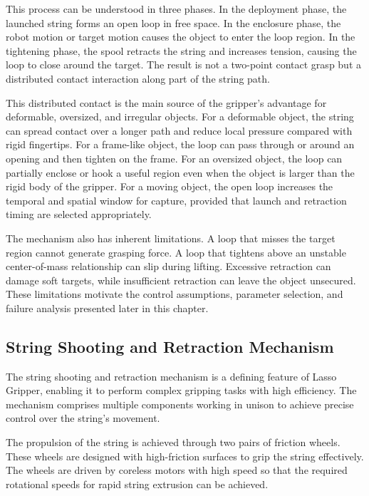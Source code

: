 This process can be understood in three phases. In the deployment phase, the launched string forms an open loop in free space. In the enclosure phase, the robot motion or target motion causes the object to enter the loop region. In the tightening phase, the spool retracts the string and increases tension, causing the loop to close around the target. The result is not a two-point contact grasp but a distributed contact interaction along part of the string path.

This distributed contact is the main source of the gripper's advantage for deformable, oversized, and irregular objects. For a deformable object, the string can spread contact over a longer path and reduce local pressure compared with rigid fingertips. For a frame-like object, the loop can pass through or around an opening and then tighten on the frame. For an oversized object, the loop can partially enclose or hook a useful region even when the object is larger than the rigid body of the gripper. For a moving object, the open loop increases the temporal and spatial window for capture, provided that launch and retraction timing are selected appropriately.

The mechanism also has inherent limitations. A loop that misses the target region cannot generate grasping force. A loop that tightens above an unstable center-of-mass relationship can slip during lifting. Excessive retraction can damage soft targets, while insufficient retraction can leave the object unsecured. These limitations motivate the control assumptions, parameter selection, and failure analysis presented later in this chapter.



\subsection{String Shooting and Retraction Mechanism}

The string shooting and retraction mechanism is a defining feature of Lasso Gripper, enabling it to perform complex gripping tasks with high efficiency. The mechanism comprises multiple components working in unison to achieve precise control over the string's movement.

The propulsion of the string is achieved through two pairs of friction wheels. These wheels are designed with high-friction surfaces to grip the string effectively. The wheels are driven by coreless motors with high speed so that the required rotational speeds for rapid string extrusion can be achieved\cite{murata2024elastic}.

